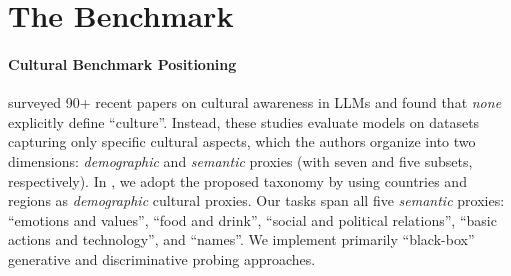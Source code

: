 \section{The \dsname Benchmark}
\label{sec:benchmark}
%
%
\paragraph{Cultural Benchmark Positioning}
%
\citet{adilazuarda-etal-2024-towards} surveyed 90+ recent papers on cultural awareness in LLMs and found that \emph{none} explicitly define ``culture''.
%
Instead, these studies evaluate models on datasets capturing only specific cultural aspects, which the authors organize into two dimensions: \textit{demographic} and \textit{semantic} proxies (with seven and five subsets, respectively).
%
In \dsname, we adopt the proposed taxonomy by using countries and regions as \textit{demographic} cultural proxies.
%
Our tasks span all five \textit{semantic} proxies: ``emotions and values'', ``food and drink'', ``social and political relations'', ``basic actions and technology'', and ``names''.
%
We implement primarily ``black-box'' generative and discriminative probing approaches.%
%


